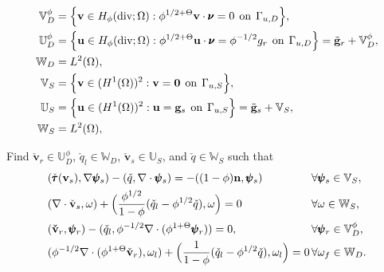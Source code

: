 \documentclass[usenames,dvipsnames,letterpaper,landscape,final]{slides}
\theoremstyle{definition}
\begin{document}
\begin{myslide}
		  \vspace*{-0.4cm}
\begin{equation*}\label{eq:spaces}
		  \begin{aligned}
					 \mathbb{V}^\phi_D &= \Big\{\mathbf{v}\in H_{\phi}(\text{div};\Omega): \phi^{1/2+\Theta} \mathbf{v}\cdot \pmb{\nu} = 0 \hspace{0.15cm} \text{on}\hspace{0.15cm} \Gamma_{u,D}  \Big\},\\
					 \mathbb{U}^\phi_D &= \Big\{\mathbf{u}\in H_{\phi}(\text{div};\Omega): \phi^{1/2+\Theta} \mathbf{u}\cdot \pmb{\nu} = \phi^{-1/2}g_r \hspace{0.15cm} \text{on}\hspace{0.15cm} \Gamma_{u,D}  \Big\} = \tilde{\mathbf{g}}_r + \mathbb{V}^\phi_D,\\
					 \mathbb{W}_D      &= L^2(\Omega),\\
					 \mathbb{V}_S &= \Big\{\mathbf{v}\in (H^1(\Omega))^2 : \mathbf{v} = \mathbf{0} \hspace{0.15cm} \text{on}\hspace{0.15cm}  \Gamma_{u,S} \Big\},\\
					 \mathbb{U}_S &= \Big\{\mathbf{u}\in (H^1(\Omega))^2 : \mathbf{u} = \mathbf{g}_s \hspace{0.15cm} \text{on}\hspace{0.15cm}  \Gamma_{u,S} \Big\} 
					 = \tilde{\mathbf{g}}_s + \mathbb{V}_S,\\
		  \mathbb{W}_S &= L^2(\Omega),
		  \end{aligned}
\end{equation*}


Find $\check{\mathbf{v}}_r \in \mathbb{U}^{\phi}_D$,
$\check{q}_l \in \mathbb{W}_D$, $\check{\mathbf{v}}_s \in \mathbb{U}_S$, and $\check{q}\in \mathbb{W}_S$ such that
\begin{equation*}
\begin{alignedat}{2}
		  &(\check{\pmb{\tau}}(\bold{v}_{s}),\nabla \pmb{\psi}_s) - (\check{q}, \nabla \cdot \pmb{\psi}_s) = -((1-\phi)\bold{n}, \pmb{\psi}_s) &&\forall\pmb{\psi}_s \in \mathbb{V}_S,\\
					 &(\nabla \cdot \check{\bold{v}}_{s}, \omega)  + \Big(\frac{\phi^{1/2}}{1-\phi} (\check{q}_l - \phi^{1/2}\check{q}), \omega\Big) = 0 &&\forall \omega \in \mathbb{W}_S,\\
					 &(\bold{\check{v}}_{r},\pmb{\psi}_r)  - (\check{q}_{l},\phi^{-1/2} \nabla \cdot (\phi^{1+\Theta}\pmb{\psi}_r)) = 0, &&\forall \pmb{\psi}_r \in \mathbb{V}_D^\phi,\\
					 \nonumber
					 &(\phi^{-1/2} \nabla \cdot (\phi^{1+\Theta}\check{\bold{v}}_r),\omega_l) + \Big(\frac{1}{1-\phi}(\check{q}_{l} - \phi^{1/2}\check{q}),\omega_l \Big) = 0 \,&&\forall \omega_f \in 
		  \mathbb{W}_D.
\end{alignedat}
\end{equation*}


\end{myslide}
\end{document}
